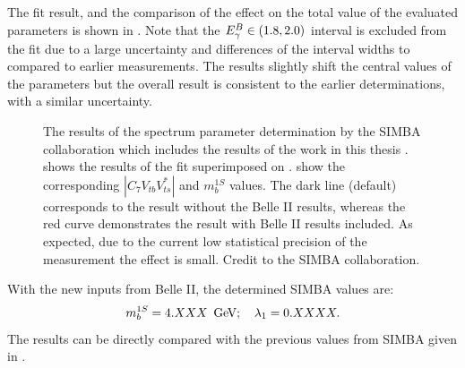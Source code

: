 The fit result, and the comparison of the effect on the total value of the evaluated parameters is shown in .
Note that the ${E^B_{\gamma}}\in(1.8,2.0)$ interval is excluded from the fit due to a large uncertainty and differences of the interval widths
to compared to earlier \BtoXsgamma measurements.
The results slightly shift the central values of the parameters but the overall result is consistent to the earlier determinations,
with a similar uncertainty.
\begin{figure}[htbp!]
    \centering
    \caption{\label{fig:simba_c7}
    The results of the \BtoXsgamma spectrum parameter determination by the SIMBA collaboration which includes the results of the work in this thesis
    \cite{Bernlochner:2020jlt}.
     shows the results of the fit superimposed on .
     show the corresponding $|C_7V_{tb}V^*_{ts}|$ and $m_b^{1S}$ values.
    The dark line (default) corresponds to the result without the Belle II results, whereas the red curve demonstrates the result with Belle II results included.
    As expected, due to the current low statistical precision of the \BtoXsgamma measurement the effect is small.
    Credit to the SIMBA collaboration.
    }
\end{figure}


With the new inputs from Belle II, the determined SIMBA values are:
\begin{equation}\label{eq:new_simba_values}
    m_b^{1S}= 4.XXX~\mathrm{\,Ge\kern -0.1em V}; \quad \lambda_1 = 0.XXXX.
\end{equation}
The results can be directly compared with the previous values from SIMBA given in .

